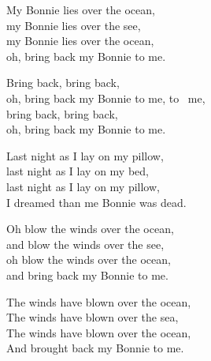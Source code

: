 
\ve{}
My Bonnie lies over the ocean,\\
my Bonnie lies over the see, \\
my Bonnie lies over the ocean,\\
oh, bring back my Bonnie to me.

\cho{}
Bring back, bring back,\\
oh, bring back my Bonnie to me, to \ me,\\
bring back, bring back,\\
oh, bring back my Bonnie to me.

\ve{}
Last night as I lay on my pillow,\\
last night as I lay on my bed,\\
last night as I lay on my pillow,\\
I dreamed than me Bonnie was dead.

\cho{}

\ve{}
Oh blow the winds over the ocean,\\
and blow the winds over the see,\\
oh blow the winds over the ocean,\\
and bring back my Bonnie to me.

\cho{}

\ve{}
The winds have blown over the ocean,\\
The winds have blown over the sea,\\
The winds have blown over the ocean,\\
And brought back my Bonnie to me. 

\cho{}

\esong